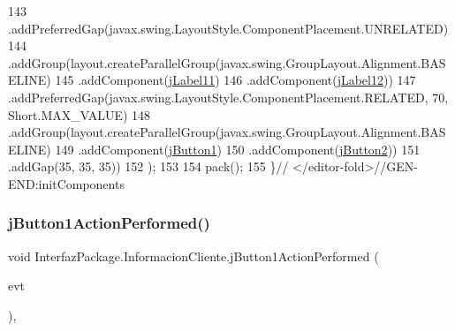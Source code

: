 \begin{DoxyCode}
143                 .addPreferredGap(javax.swing.LayoutStyle.ComponentPlacement.UNRELATED)
144                 .addGroup(layout.createParallelGroup(javax.swing.GroupLayout.Alignment.BASELINE)
145                     .addComponent(\mbox{\hyperlink{class_interfaz_package_1_1_informacion_cliente_a31fbf3562a8a9f5df8d2b5b19f2f9f76}{jLabel11}})
146                     .addComponent(\mbox{\hyperlink{class_interfaz_package_1_1_informacion_cliente_ae99ca6a6dc9eb57f924b11c625ab6209}{jLabel12}}))
147                 .addPreferredGap(javax.swing.LayoutStyle.ComponentPlacement.RELATED, 70, Short.MAX\_VALUE)
148                 .addGroup(layout.createParallelGroup(javax.swing.GroupLayout.Alignment.BASELINE)
149                     .addComponent(\mbox{\hyperlink{class_interfaz_package_1_1_informacion_cliente_aa7c801b9c192b73cd1b5a0d73a3a7de3}{jButton1}})
150                     .addComponent(\mbox{\hyperlink{class_interfaz_package_1_1_informacion_cliente_a18ab6870a03adb8b530c00f93ff9656b}{jButton2}}))
151                 .addGap(35, 35, 35))
152         );
153 
154         pack();
155     \}\textcolor{comment}{// </editor-fold>//GEN-END:initComponents}
\end{DoxyCode}
\mbox{\label{class_interfaz_package_1_1_informacion_cliente_ac9bf2de6739f822e7b6bc9f933c3a058}} 
\subsubsection{\texorpdfstring{j\+Button1\+Action\+Performed()}{jButton1ActionPerformed()}}
{\footnotesize\ttfamily void Interfaz\+Package.\+Informacion\+Cliente.\+j\+Button1\+Action\+Performed (\begin{DoxyParamCaption}\item[{java.\+awt.\+event.\+Action\+Event}]{evt }\end{DoxyParamCaption})\hspace{0.3cm}{\ttfamily [inline]}, {\ttfamily [private]}}


